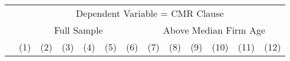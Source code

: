 {
\def\sym#1{\ifmmode^{#1}\else\(^{#1}\)\fi}
\begin{tabular}{l*{12}{c}}
\toprule &\multicolumn{12}{c}{Dependent Variable = CMR Clause} \\\cmidrule(lr){2-13}
                    &\multicolumn{6}{c}{Full Sample}                                                                                                    &\multicolumn{6}{c}{Above Median Firm Age}                                                                                          \\\cmidrule(lr){2-7}\cmidrule(lr){8-13}
                    &\multicolumn{1}{c}{(1)}         &\multicolumn{1}{c}{(2)}         &\multicolumn{1}{c}{(3)}         &\multicolumn{1}{c}{(4)}         &\multicolumn{1}{c}{(5)}         &\multicolumn{1}{c}{(6)}         &\multicolumn{1}{c}{(7)}         &\multicolumn{1}{c}{(8)}         &\multicolumn{1}{c}{(9)}         &\multicolumn{1}{c}{(10)}         &\multicolumn{1}{c}{(11)}         &\multicolumn{1}{c}{(12)}         \\


\end{tabular}}
